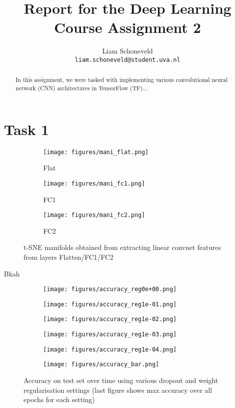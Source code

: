 \documentclass{article}
\title{Report for the Deep Learning Course Assignment 2 }
\author{
	Liam Schoneveld \\
	\texttt{liam.schoneveld@student.uva.nl}
}
\begin{document}

\maketitle

\begin{abstract}
In this assignment, we were tasked with implementing various convolutional neural network (CNN) architectures in TensorFlow (TF)...

\end{abstract}

\section{Task 1}



\begin{figure}[h]
	\centering
	\begin{subfigure}{.31\textwidth}
		\texttt{[image: figures/mani\_flat.png]}
		\caption{Flat}
	\end{subfigure}%
	\begin{subfigure}{.31\textwidth}
		\texttt{[image: figures/mani\_fc1.png]}
		\caption{FC1}
	\end{subfigure}%
	\begin{subfigure}{.37\textwidth}
		\texttt{[image: figures/mani\_fc2.png]}
		\caption{FC2}
	\end{subfigure}
	\caption{t-SNE manifolds obtained from extracting linear convnet features from layers Flatten/FC1/FC2}
	\label{fig:tsnebasic}
\end{figure}

Bkah

\begin{figure}
	\centering
	\begin{subfigure}{.33\textwidth}
		\texttt{[image: figures/accuracy\_reg0e+00.png]}
	\end{subfigure}%
	\begin{subfigure}{.33\textwidth}
		\texttt{[image: figures/accuracy\_reg1e-01.png]}
	\end{subfigure}%
	\begin{subfigure}{.33\textwidth}
		\texttt{[image: figures/accuracy\_reg1e-02.png]}
	\end{subfigure}
	\begin{subfigure}{.33\textwidth}
		\texttt{[image: figures/accuracy\_reg1e-03.png]}
	\end{subfigure}%
	\begin{subfigure}{.33\textwidth}
		\texttt{[image: figures/accuracy\_reg1e-04.png]}
	\end{subfigure}%
	\begin{subfigure}{.33\textwidth}
		\texttt{[image: figures/accuracy\_bar.png]}
	\end{subfigure}
	\caption{Accuracy on test set over time using various dropout and weight regularisation settings (last figure shows max accuracy over all epochs for each setting)}
	\label{fig:lms}
\end{figure}
\end{document}
